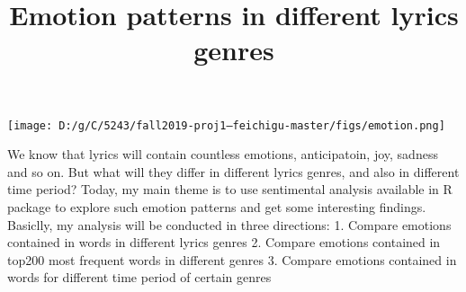 \documentclass[]{article}
\title{Emotion patterns in different lyrics genres}
\author{}
\date{}
\newenvironment{Shaded}{\begin{snugshade}}{\end{snugshade}}
\newcommand{\CommentTok}[1]{\textcolor[rgb]{0.56,0.35,0.01}{\textit{#1}}}
\newcommand{\DecValTok}[1]{\textcolor[rgb]{0.00,0.00,0.81}{#1}}
\newcommand{\KeywordTok}[1]{\textcolor[rgb]{0.13,0.29,0.53}{\textbf{#1}}}
\newcommand{\NormalTok}[1]{#1}
\newcommand{\OperatorTok}[1]{\textcolor[rgb]{0.81,0.36,0.00}{\textbf{#1}}}
\newcommand{\StringTok}[1]{\textcolor[rgb]{0.31,0.60,0.02}{#1}}
\begin{document}
\maketitle

\texttt{[image: D:/g/C/5243/fall2019-proj1--feichigu-master/figs/emotion.png]}

\newline
\newline
\newline

We know that lyrics will contain countless emotions, anticipatoin, joy,
sadness and so on. But what will they differ in different lyrics genres,
and also in different time period? Today, my main theme is to use
sentimental analysis available in R package to explore such emotion
patterns and get some interesting findings. Basiclly, my analysis will
be conducted in three directions: 1. Compare emotions contained in words
in different lyrics genres 2. Compare emotions contained in top200 most
frequent words in different genres 3. Compare emotions contained in
words for different time period of certain genres

\begin{Shaded}
\end{Shaded}
\end{document}

